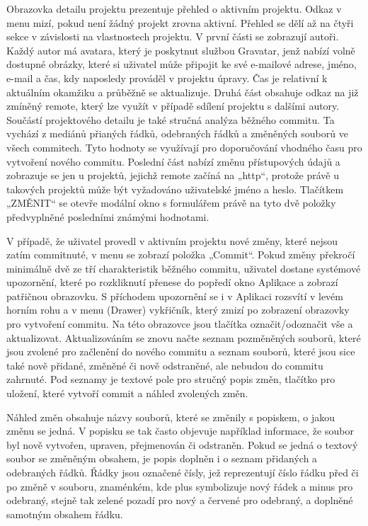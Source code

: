 Obrazovka detailu projektu prezentuje přehled o aktivním projektu. Odkaz v menu mizí, pokud není žádný projekt zrovna aktivní. Přehled se dělí až na čtyři sekce v závislosti na vlastnostech projektu. V první části se zobrazují autoři. Každý autor má avatara, který je poskytnut službou Gravatar, jenž nabízí volně dostupné obrázky, které si uživatel může připojit ke své e-mailové adrese, jméno, e-mail a čas, kdy naposledy prováděl v projektu úpravy. Čas je relativní k aktuálním okamžiku a průběžně se aktualizuje. Druhá část obsahuje odkaz na již zmíněný remote, který lze využít v případě sdílení projektu s dalšími autory. Součástí projektového detailu je také stručná analýza běžného commitu. Ta vychází z mediánů přianých řádků, odebraných řádků a změněných souborů ve všech commitech. Tyto hodnoty se využívají pro doporučování vhodného času pro vytvoření nového commitu. Poslední část nabízí změnu přístupových údajů a zobrazuje se jen u projektů, jejichž remote začíná na „http“, protože právě u takových projektů může být vyžadováno uživatelské jméno a heslo. Tlačítkem „ZMĚNIT“ se otevře modální okno s formulářem právě na tyto dvě položky předvyplněné posledními známými hodnotami.

V případě, že uživatel provedl v aktivním projektu nové změny, které nejsou zatím commitnuté, v menu se zobrazí položka „Commit“. Pokud změny překročí minimálně dvě ze tří charakteristik běžného commitu, uživatel dostane systémové upozornění, které po rozkliknutí přenese do popředí okno Aplikace a zobrazí patřičnou obrazovku. S příchodem upozornění se i v Aplikaci rozsvítí v levém horním rohu a v menu (Drawer) vykřičník, který zmizí po zobrazení obrazovky pro vytvoření commitu. Na této obrazovce jsou tlačítka označit/odoznačit vše a aktualizovat. Aktualizováním se znovu načte seznam pozměněných souborů, které jsou zvolené pro začlenění do nového commitu a seznam souborů, které jsou sice také nově přidané, změněné či nově odstraněné, ale nebudou do commitu zahrnuté. Pod seznamy je textové pole pro stručný popis změn, tlačítko pro uložení, které vytvoří commit a náhled zvolených změn.

Náhled změn obsahuje názvy souborů, které se změnily s popiskem, o jakou změnu se jedná. V popisku se tak často objevuje například informace, že soubor byl nově vytvořen, upraven, přejmenován či odstraněn. Pokud se jedná o textový soubor se změněným obsahem, je popis doplněn i o seznam přidaných a odebraných řádků. Řádky jsou označené čísly, jež reprezentují číslo řádku před či po změně v souboru, znaménkém, kde plus symbolizuje nový řádek a minus pro odebraný, stejně tak zelené pozadí pro nový a červené pro odebraný, a doplněné samotným obsahem řádku.


